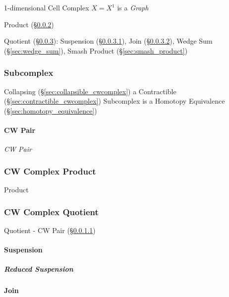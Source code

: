 1-dimensional Cell Complex $X = X^1$ is a \emph{Graph}

Product (\S\ref{sec:cwcomplex_product})

Quotient (\S\ref{sec:cwcomplex_quotient}): Suspension
(\S\ref{sec:suspension}), Join (\S\ref{sec:join}), Wedge Sum
(\S\ref{sec:wedge_sum}), Smash Product (\S\ref{sec:smash_product})



\subsubsection{Subcomplex}\label{sec:subcomplex}

Collapsing (\S\ref{sec:collapsible_cwcomplex}) a Contractible
(\S\ref{sec:contractible_cwcomplex}) Subcomplex is a Homotopy
Equivalence (\S\ref{sec:homotopy_equivalence})



\paragraph{CW Pair}\label{sec:cw_pair}\hfill

\emph{CW Pair}



\subsubsection{CW Complex Product}\label{sec:cwcomplex_product}

Product



\subsubsection{CW Complex Quotient}\label{sec:cwcomplex_quotient}

Quotient - CW Pair (\S\ref{sec:cw_pair})



\paragraph{Suspension}\label{sec:suspension}\hfill

\subparagraph{Reduced Suspension}\label{sec:reduced_suspension}\hfill



\paragraph{Join}\label{sec:join}\hfill

